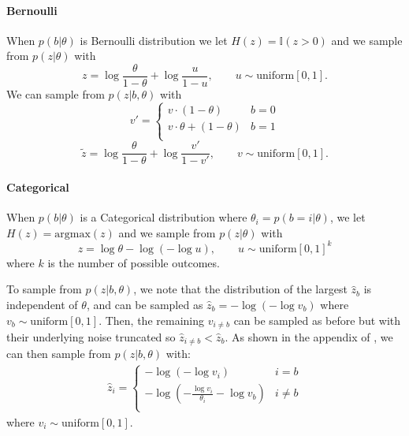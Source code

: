 \documentclass{article}
\begin{document}
\paragraph{Bernoulli} When $p(b|\theta)$ is Bernoulli distribution we let $H(z) = \mathbb{I}(z>0)$ and we sample from $p(z|\theta)$ with 
$$ z = \log \frac{\theta}{1 - \theta} + \log \frac{u}{1-u}, \qquad u \sim \text{uniform}[0,1].
$$ 
We can sample from $p(z|b, \theta)$ with 
\[
v' =    \left\{
\begin{array}{ll}
      v\cdot(1-\theta) & b = 0 \\
      v\cdot\theta + (1 - \theta) & b = 1 \\
\end{array} 
\right.
\]
$$ \tilde{z} = \log \frac{\theta}{1 - \theta} + \log \frac{v'}{1-v'}, \qquad v \sim \text{uniform}[0, 1].$$

\paragraph{Categorical} When $p(b|\theta)$ is a Categorical distribution where $\theta_i = p(b=i|\theta)$, we let $H(z) = \text{argmax}(z)$ and we sample from $p(z|\theta)$ with 
$$ z = \log\theta -\log(-\log u), \qquad u \sim \text{uniform}[0,1]^k
$$ where $k$ is the number of possible outcomes.


To sample from $p(z|b, \theta)$, we note that the distribution of the largest $\hat z_b$ is independent of $\theta$, and can be sampled as $\hat z_b = -\log (-\log v_b)$ where $v_b\sim \text{uniform}[0, 1]$.
Then, the remaining $v_{i\neq b}$ can be sampled as before but with their underlying noise truncated so $\hat z_{i \neq b} < \hat z_b$. As shown in the appendix of \cite{tucker2017rebar}, we can then sample from $p(z|b, \theta)$ with:
%
\begin{align}
\hat z_i =    \left\{
\begin{array}{ll}
      -\log(-\log v_i )& i = b \\
      -\log \left( -\frac{\log v_i}{\theta_i} - \log v_b \right) & i \neq b \\
\end{array} 
\right.
\end{align}
%
where $v_i \sim \text{uniform}[0, 1]$.


\end{document}
